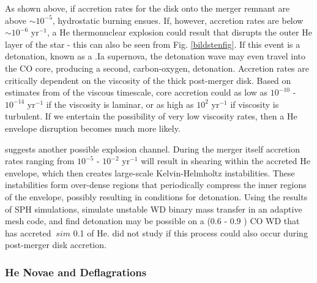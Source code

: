 As shown above, if accretion rates for the disk onto the merger remnant are above $\sim 10^{-5}$, hydrostatic burning ensues.  If, however, accretion rates are below $\sim 10^{-6}$ {\Msun} yr$^{-1}$, a He thermonuclear explosion could result that disrupts the outer He layer of the star - this can also be seen from Fig. \ref{bildstenfig}.  If this event is a detonation, known as a .Ia supernova, the detonation wave may even travel into the CO core, producing a second, carbon-oxygen, detonation.  Accretion rates are critically dependent on the viscosity of the thick post-merger disk.  Based on estimates from \citeauthor{loreig09} of the viscous timescale, core accretion could as low as $10^{-10}$ - $10^{-14}$ {\Msun} yr$^{-1}$ if the viscosity is laminar, or as high as $10^2$ {\Msun} yr$^{-1}$ if viscosity is turbulent.  If we entertain the possibility of very low viscosity rates, then a He envelope disruption becomes much more likely.

\cite{guil+10} suggests another possible explosion channel.  During the merger itself accretion rates ranging from $10^{-5}$ - $10^{-2}$ {\Msun} yr$^{-1}$ will result in shearing within the accreted He envelope, which then creates large-scale Kelvin-Helmholtz instabilities.  These instabilities form over-dense regions that periodically compress the inner regions of the envelope, possibly resulting in conditions for detonation.  Using the results of SPH simulations, \cite{guil+10} simulate unstable WD binary mass transfer in an adaptive mesh code, and find detonation may be possible on a (0.6 - 0.9 {\Msun}) CO WD that has accreted $~sim$ 0.1 {\Msun} of He.  \citeauthor{guil+10} did not study if this process could also occur during post-merger disk accretion.

\subsubsection{He Novae and Deflagrations}

